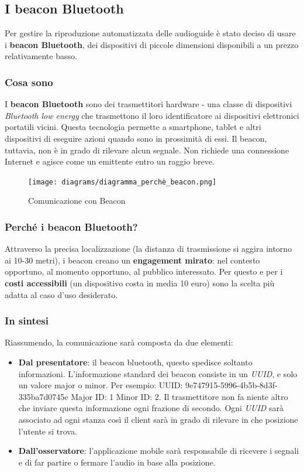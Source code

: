 \subsection{I beacon Bluetooth}
Per gestire la riproduzione automatizzata delle audioguide è stato deciso di usare i \textbf{beacon Bluetooth}, dei dispositivi di piccole dimensioni disponibili a un prezzo relativamente basso. 

\subsubsection{Cosa sono}
I \textbf{beacon Bluetooth} sono dei trasmettitori hardware - una classe di dispositivi \emph{Bluetooth low energy} che trasmettono il loro identificatore ai dispositivi elettronici portatili vicini. Questa tecnologia permette a smartphone, tablet e altri dispositivi di eseguire azioni quando sono in prossimità di essi. Il beacon, tuttavia, non è in grado di rilevare alcun segnale. Non richiede una connessione Internet e agisce come un emittente entro un raggio breve.\cite{what_are_beacons}


\begin{center}
\begin{figure}[htp]
    \centering
    \texttt{[image: diagrams/diagramma\_perchè\_beacon.png]}
    \caption{Comunicazione con Beacon}
    \label{fig:comunicazione_beacon}
\end{figure}
\end{center}

\subsubsection{Perché i beacon Bluetooth?}
Attraverso la precisa localizzazione (la distanza di trasmissione si aggira intorno ai 10-30 metri), i beacon creano un \textbf{engagement mirato}: nel contesto opportuno, al momento opportuno, al pubblico interessato. Per questo e per i \textbf{costi accessibili} (un dispositivo costa in media 10 euro) sono la scelta più adatta al caso d'uso desiderato.

\subsubsection{In sintesi}
Riassumendo, la comunicazione sarà composta da due elementi:
\begin{itemize}
    \item \textbf{Dal presentatore}: il beacon bluetooth, questo spedisce soltanto informazioni. L’informazione standard dei beacon consiste in un \emph{UUID}, e solo un valore major o minor. Per
    esempio: UUID: 9e747915-5996-4b5b-8d3f-335ba7d0745e Major ID: 1 Minor ID: 2. Il trasmettitore non fa niente altro che inviare questa informazione ogni frazione di secondo. Ogni \emph{UUID} sarà associato ad ogni stanza così il client sarà in grado di rilevare in che posizione l'utente si trova.
    \item \textbf{Dall'osservatore}: l'applicazione mobile sarà responsabile di ricevere i segnali e di far partire o fermare l'audio in base alla posizione.
\end{itemize}

